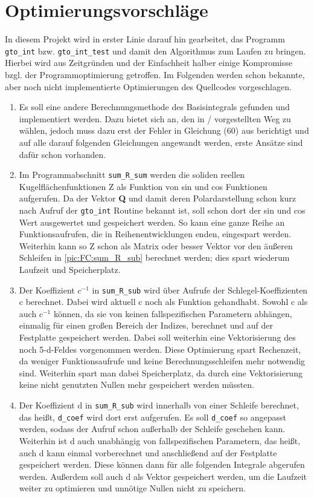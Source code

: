 \section{Optimierungsvorschläge}
%
In diesem Projekt wird in erster Linie darauf hin gearbeitet, das Programm 
\texttt{gto\_int} bzw. \texttt{gto\_int\_test} und damit den Algorithmus zum 
Laufen zu bringen. Hierbei wird aus Zeitgründen und der Einfachheit halber 
einige Kompromisse bzgl. der Programmoptimierung getroffen. Im Folgenden werden 
schon bekannte, aber noch nicht implementierte Optimierungen des Quellcodes 
vorgeschlagen.
\begin{enumerate}
	\item Es soll eine andere Berechnungsmethode des Basisintegrals 
	gefunden und implementiert werden. Dazu bietet sich an, den in 
	\cite{av:1a} / \cite{av:1a2} vorgestellten Weg zu wählen, jedoch muss 
	dazu 
	erst der Fehler in Gleichung (60) aus \cite{av:1a} berichtigt und auf 
	alle darauf folgenden Gleichungen angewandt werden, erste Ansätze sind 
	dafür schon vorhanden.
	\item Im Programmabschnitt \texttt{sum\_R\_sum} werden die soliden reellen 
	Kugelflächenfunktionen Z als Funktion von sin und cos Funktionen 
	aufgerufen. Da der Vektor \textbf{Q} und damit deren Polardarstellung schon 
	kurz nach Aufruf der \texttt{gto\_int} Routine bekannt ist, soll schon dort 
	der sin und cos Wert ausgewertet und gespeichert werden. So kann eine 
	ganze Reihe an Funktionsaufrufen, die in Reihenentwicklungen enden, 
	eingespart werden. Weiterhin kann so Z schon als Matrix oder besser Vektor 
	vor den äußeren Schleifen in \ref{pic:FC:sum_R_sub} berechnet werden; dies 
	spart wiederum Laufzeit und Speicherplatz.
	\item Der Koeffizient $c^{-1}$ in \texttt{sum\_R\_sub} wird über Aufrufe 
	der Schlegel-Koeffizienten c berechnet. Dabei wird aktuell c noch als 
	Funktion gehandhabt. Sowohl c als auch $c^{-1}$ können, da sie von keinen 
	fallspezifischen Parametern abhängen, einmalig für einen großen Bereich 
	der Indizes, berechnet und auf der Festplatte gespeichert werden. Dabei 
	soll weiterhin eine Vektorisierung des noch 5-d-Feldes vorgenommen werden. 
	Diese Optimierung 	spart Rechenzeit, da weniger Funktionsaufrufe und 
	keine Berechnungsschleifen mehr notwendig sind. Weiterhin spart man dabei 
	Speicherplatz, da durch eine Vektorisierung keine nicht genutzten Nullen 
	mehr gespeichert werden müssten.
	\item Der Koeffizient d in \texttt{sum\_R\_sub} wird innerhalb von einer 
	Schleife berechnet, das heißt, \texttt{d\_coef} wird dort erst aufgerufen. 
	Es soll \texttt{d\_coef} so	angepasst werden, sodass der Aufruf schon 
	außerhalb der Schleife geschehen kann. Weiterhin  ist d auch unabhängig von 
	fallspezifischen Parametern, das heißt,	auch d kann einmal vorberechnet 
	und anschließend auf der Festplatte gespeichert werden. Diese 
	können dann für alle folgenden Integrale abgerufen werden. Außerdem soll 
	auch d als Vektor gespeichert werden, um die Laufzeit weiter zu optimieren 
	und unnötige Nullen nicht zu speichern.
\end{enumerate} 
%
%
%